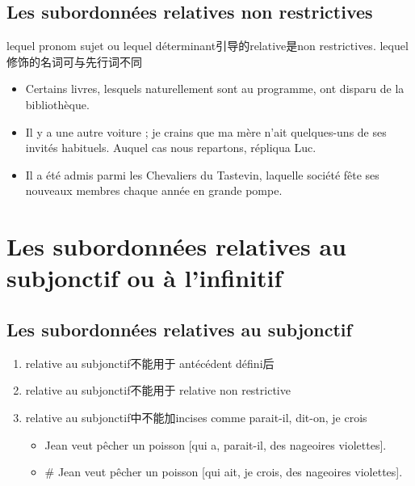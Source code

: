 \documentclass[UTF8]{report}
\begin{document}
\subsection{Les subordonnées relatives non restrictives}
lequel pronom sujet ou lequel déterminant引导的relative是non restrictives. lequel修饰的名词可与先行词不同
\begin{itemize}
    \item Certains livres, lesquels naturellement sont au programme, ont disparu de la bibliothèque.
    \item Il y a une autre voiture ; je crains que ma mère n’ait quelques-uns de ses invités habituels. Auquel cas nous repartons, répliqua Luc.
    \item Il a été admis parmi les Chevaliers du Tastevin, laquelle société fête ses nouveaux membres chaque année en grande pompe.
\end{itemize}

\section{Les subordonnées relatives au subjonctif ou à l’infinitif}
\subsection{Les subordonnées relatives au subjonctif}
\begin{enumerate}
    \item relative au subjonctif不能用于 antécédent défini后
    \item relative au subjonctif不能用于 relative non restrictive
    \item relative au subjonctif中不能加incises comme parait-il, dit-on, je crois
    \begin{itemize}
        \item Jean veut pêcher un poisson [qui a, parait-il, des nageoires violettes].
        \item \# Jean veut pêcher un poisson [qui ait, je crois, des nageoires violettes].
    \end{itemize}
\end{enumerate}
\end{document}
